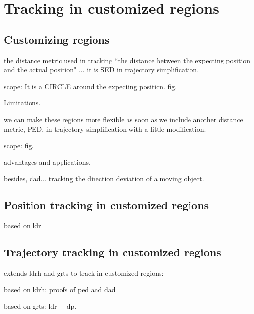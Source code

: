 

\section{Tracking in customized regions}
\label{sec:position}


\subsection{Customizing regions}

the distance metric used in tracking ``the distance between the expecting position and the actual position" ... it is SED in trajectory simplification. 

scope: It is  a CIRCLE around the expecting position. fig.

Limitations.

we can make these regions more flexible as soon as we include another distance metric, PED, in trajectory simplification with a little modification.

scope: fig.

advantages and applications.

besides, dad... tracking the direction deviation of a moving object.
 
\subsection{Position tracking in customized regions}
based on ldr


\subsection{Trajectory tracking in customized regions}
extends ldrh and grts to track in customized regions:

based on ldrh: proofs of ped and dad

based on grts: ldr + dp. 
